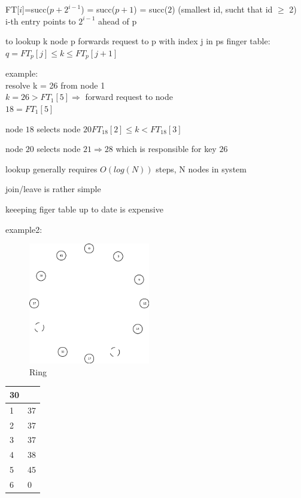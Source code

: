 \documentclass[ngerman,a4paper]{report}
\begin{document}
\begin{compactitem}
FT[$i$]=succ($p+2^{i-1}$) = succ($p+1$) = succ($2$) (smallest id, sucht that id $\geq$ 2)\\
i-th entry points to $2^{i-1}$ ahead of p
\item to lookup k node p forwards request to p with index j in ps finger table:\\
$q = FT_p[j] \leq k \leq FT_p[j+1]$
\item example:\\
resolve k = 26 from node 1 \\
$k=26 > FT_1[5] \Rightarrow$ forward request to node\\
$18 = FT_1[5]$
\begin{compactitem}
\item node $18$ selects node $20 FT_{18}[2] \leq k < FT_{18}[3]$\\
\item node $20$ selects node $21 \Rightarrow 28 $ which is responsible for key $26$\\
\item lookup generally requires $O(log(N))$ steps, N nodes in system
\item join/leave is rather simple
\item keeeping figer table up to date is expensive
\end{compactitem} 
\item example2:\\
\begin{figure}[h]
	\centering
	\includegraphics[width=200px]{gfx/Chord_Fingertable.png}
	\caption{Ring}
	\label{img:ring}
\end{figure}
\begin{tabular}{|l|l|}
\hline
30 & \\
\hline
1 & 37\\
\hline
2 & 37\\
\hline
3 & 37\\
\hline
4 & 38\\
\hline
5 & 45\\
\hline
6 & 0\\
\hline
\end{tabular}

\end{compactitem}
\end{document}
